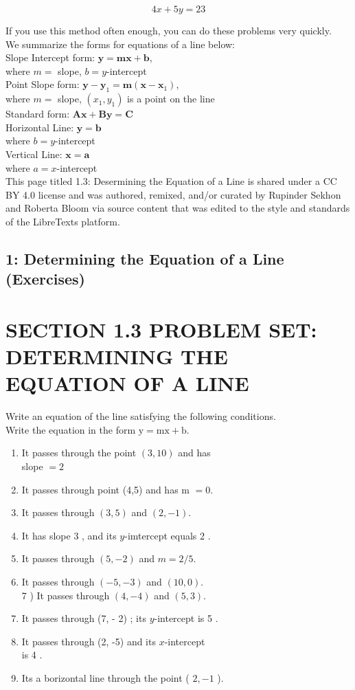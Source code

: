 $$
4 x+5 y=23
$$

If you use this method often enough, you can do these problems very quickly.\\
We summarize the forms for equations of a line below:\\
Slope Intercept form: $\mathbf{y}=\mathbf{m x}+\mathbf{b}$,\\
where $m=$ slope, $b=y$-intercept\\
Point Slope form: $\mathbf{y}-\mathbf{y}_{1}=\mathbf{m}\left(\mathbf{x}-\mathbf{x}_{1}\right)$,\\
where $m=$ slope, $\left(x_{1}, y_{1}\right)$ is a point on the line\\
Standard form: $\mathbf{A x}+\mathbf{B y}=\mathbf{C}$\\
Horizontal Line: $\mathbf{y}=\mathbf{b}$\\
where $b=y$-intercept\\
Vertical Line: $\mathbf{x}=\mathbf{a}$\\
where $a=x$-intercept\\
This page titled 1.3: Desermining the Equation of a Line is shared under a CC BY 4.0 license and was authored, remixed, and/or curated by Rupinder Sekhon and Roberta Bloom via source content that was edited to the style and standards of the LibreTexts platform.

\subsection*{1: Determining the Equation of a Line (Exercises)}
\section*{SECTION 1.3 PROBLEM SET: DETERMINING THE EQUATION OF A LINE}
Write an equation of the line satisfying the following conditions.\\
Write the equation in the form $\mathrm{y}=\mathrm{mx}+\mathrm{b}$.

\begin{enumerate}
  \item It passes through the point $(3,10)$ and has\\
slope $=2$
  \item It passes through point (4,5) and has m $=0$.
  \item It passes through $(3,5)$ and $(2,-1)$.
  \item It has slope 3 , and its $y$-imtercept equals 2 .
  \item It passes through $(5,-2)$ and $m=2 / 5$.
  \item It passes through $(-5,-3)$ and $(10,0)$.\\
7 ) It passes through $(4,-4)$ and $(5,3)$.
  \item It passes through (7, - 2) ; its $y$-intercept is 5 .
  \item It passes through (2, -5) and its $x$-intercept\\
is 4 .
  \item Its a borizontal line through the point ( $2,-1$ ).
\end{enumerate}

